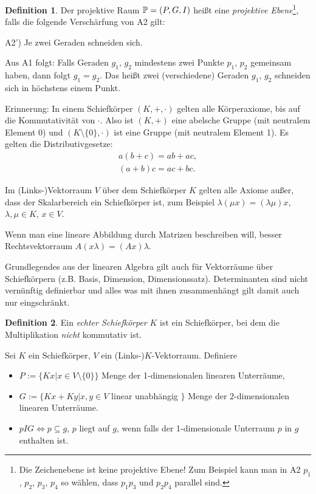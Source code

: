 \documentclass[
 a4paper,
 12pt,
 parskip=half
 ]{scrartcl}
\theoremstyle{plain}
\theoremstyle{definition}
\newtheorem*{defn*}{Definition}
\begin{document}
\begin{defn*}
 Der projektive Raum $\mathbb{P} = (P,G,I)$ heißt eine \emph{projektive Ebene}\footnote{Die Zeichenebene ist keine projektive Ebene! Zum Beispiel kann man in A2 $p_1$, $p_2$, $p_3$, $p_4$ so wählen, dass $p_1 p_3$ und $p_2 p_4$ parallel sind.}, falls die folgende Verschärfung von A2 gilt:
 
 A2') Je zwei Geraden schneiden sich.
\end{defn*}

\begin{bem}
 Aus A1 folgt: Falls Geraden $g_1$, $g_2$ mindestens zwei Punkte $p_1$, $p_2$ gemeinsam haben, dann folgt $g_1 = g_2$. Das heißt zwei (verschiedene) Geraden $g_1$, $g_2$ schneiden sich in höchstens einem Punkt.
\end{bem}

Erinnerung: In einem Schiefkörper $(K, +, \cdot)$ gelten alle Körperaxiome, bis auf die Kommutativität von $\cdot$. Also ist $(K, +)$ eine abelsche Gruppe (mit neutralem Element $0$) und $(K \setminus \{ 0 \}, \cdot)$ ist eine Gruppe (mit neutralem Element 1). Es gelten die Distributivgesetze:
\begin{align*}
 a(b+c) = ab + ac, \\
 (a+b)c = ac + bc.
\end{align*}

Im (Links-)Vektorraum $V$ über dem Schiefkörper $K$ gelten alle Axiome außer, dass der Skalarbereich ein Schiefkörper ist, zum Beispiel $\lambda( \mu x ) = (\lambda \mu) x$, $\lambda, \mu \in K$, $x \in V$.

Wenn man eine lineare Abbildung durch Matrizen beschreiben will, besser Rechtsvektorraum $A(x\lambda) = (Ax) \lambda$.

\begin{bem}
 Grundlegendes aus der linearen Algebra gilt auch für Vektorräume über Schiefkörpern (z.B. Basis, Dimension, Dimensionssatz). Determinanten sind nicht vernünf\-tig definierbar und alles was mit ihnen zusammenhängt gilt damit auch nur eingschränkt.
\end{bem}

\begin{defn*}
 Ein \emph{echter Schiefkörper} $K$ ist ein Schiefkörper, bei dem die Multiplikation \emph{nicht} kommutativ ist.
\end{defn*}

Sei $K$ ein Schiefkörper, $V$ ein (Links-)$K$-Vektorraum. Definiere
\begin{itemize}
 \item $P := \{ Kx | x \in V \setminus \{ 0 \} \}$ Menge der 1-dimensionalen linearen Unterräume,
 \item $G := \{ Kx + Ky | x, y \in V $ linear unabhängig $\}$ Menge der 2-dimensionalen linearen Unterräume.
 \item $p I G \Leftrightarrow p \subseteq g$, $p$ liegt auf $g$, wenn falls der 1-dimensionale Unterraum $p$ in $g$ enthalten ist.
\end{itemize}
\end{document}

